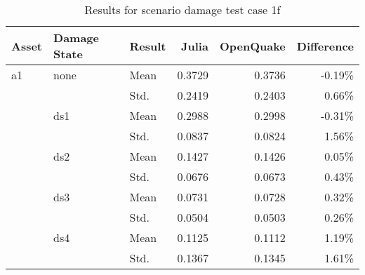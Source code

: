 \begin{table}[htbp]

\centering
\begin{tabular}{ l l l r r r }

\hline
\rowcolor{anti-flashwhite}
\bf{Asset} & \bf{Damage State} & \bf{Result} & \bf{Julia} & \bf{OpenQuake} & \bf{Difference}\\
\hline
a1 & none & Mean & 0.3729 & 0.3736 & -0.19\% \\
   &      & Std. & 0.2419 & 0.2403 & 0.66\% \\
   & ds1  & Mean & 0.2988 & 0.2998 & -0.31\% \\
   &      & Std. & 0.0837 & 0.0824 & 1.56\% \\
   & ds2  & Mean & 0.1427 & 0.1426 & 0.05\% \\
   &      & Std. & 0.0676 & 0.0673 & 0.43\% \\
   & ds3  & Mean & 0.0731 & 0.0728 & 0.32\% \\
   &      & Std. & 0.0504 & 0.0503 & 0.26\% \\
   & ds4  & Mean & 0.1125 & 0.1112 & 1.19\% \\
   &      & Std. & 0.1367 & 0.1345 & 1.61\% \\
\hline
\end{tabular}

\caption{Results for scenario damage test case 1f}
\label{tab:result-sd-1f}
\end{table}